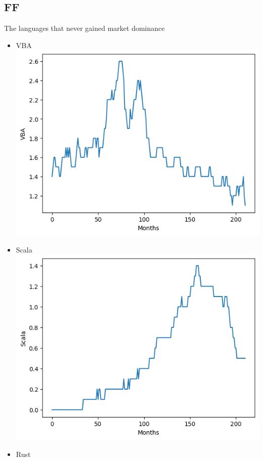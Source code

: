 \documentclass[conference]{IEEEtran}
\begin{document}
\subsection{FF}
The languages that never gained market dominance

\begin{itemize}
\item{VBA}
\includegraphics[scale=0.4]{lineplot/vba.png}
\item{Scala}
\includegraphics[scale=0.4]{lineplot/scala.png}
\item{Rust}

\end{itemize}
\end{document}
